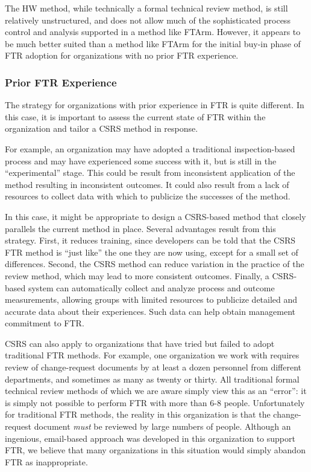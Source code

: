The HW method, while technically a formal technical review method, is still
relatively unstructured, and does not allow much of the sophisticated
process control and analysis supported in a method like FTArm.  However, it
appears to be much better suited than a method like FTArm for the initial
buy-in phase of FTR adoption for organizations with no prior FTR
experience.

\subsubsection{Prior FTR Experience} 

The strategy for organizations with prior experience in FTR is quite
different.  In this case, it is important to assess the current state of
FTR within the organization and tailor a CSRS method in response. 

For example, an organization may have adopted a traditional
inspection-based process and may have experienced some success with it, but
is still in the ``experimental'' stage.  This could be result from
inconsistent application of the method resulting in inconsistent outcomes.
It could also result from a lack of resources to collect data with which to
publicize the successes of the method.  

In this case, it might be appropriate to design a CSRS-based method that
closely parallels the current method in place.  Several advantages result
from this strategy.  First, it reduces training, since developers can be
told that the CSRS FTR method is ``just like'' the one they are now using,
except for a small set of differences.  Second, the CSRS method can reduce
variation in the practice of the review method, which may lead to more
consistent outcomes.  Finally, a CSRS-based system can automatically
collect and analyze process and outcome measurements, allowing groups with
limited resources to publicize detailed and accurate data about their
experiences. Such data can help obtain management commitment to FTR.

CSRS can also apply to organizations that have tried but failed to adopt
traditional FTR methods. For example, one organization we work with
requires review of change-request documents by at least a dozen personnel
from different departments, and sometimes as many as twenty or thirty.  All
traditional formal technical review methods of which we are aware simply
view this as an ``error'': it is simply not possible to perform FTR with
more than 6-8 people.  Unfortunately for traditional FTR methods, the
reality in this organization is that the change-request document {\em must}
be reviewed by large numbers of people.  Although an ingenious, email-based
approach was developed in this organization to support FTR, we believe that
many organizations in this situation would simply abandon FTR as
inappropriate.


